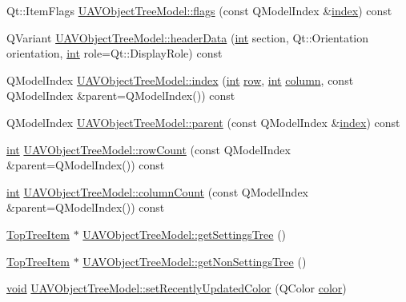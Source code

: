 \begin{DoxyCompactItemize}
\item 
Qt\-::\-Item\-Flags \hyperlink{group___u_a_v_object_browser_plugin_ga16ae36c54433edd7b07439edc1264b59}{U\-A\-V\-Object\-Tree\-Model\-::flags} (const Q\-Model\-Index \&\hyperlink{glext_8h_ab47dd9958bcadea08866b42bf358e95e}{index}) const 
\item 
Q\-Variant \hyperlink{group___u_a_v_object_browser_plugin_gaa19ce01eb026443086adfe5063bbc233}{U\-A\-V\-Object\-Tree\-Model\-::header\-Data} (\hyperlink{ioapi_8h_a787fa3cf048117ba7123753c1e74fcd6}{int} section, Qt\-::\-Orientation orientation, \hyperlink{ioapi_8h_a787fa3cf048117ba7123753c1e74fcd6}{int} role=Qt\-::\-Display\-Role) const 
\item 
Q\-Model\-Index \hyperlink{group___u_a_v_object_browser_plugin_ga9b9e52145b78d333effe586a41478701}{U\-A\-V\-Object\-Tree\-Model\-::index} (\hyperlink{ioapi_8h_a787fa3cf048117ba7123753c1e74fcd6}{int} \hyperlink{glext_8h_a11b277b422822f784ee248b43eee3e1e}{row}, \hyperlink{ioapi_8h_a787fa3cf048117ba7123753c1e74fcd6}{int} \hyperlink{glext_8h_a3b58c39b1b7ca6f4012b27e84de3bdb3}{column}, const Q\-Model\-Index \&parent=Q\-Model\-Index()) const 
\item 
Q\-Model\-Index \hyperlink{group___u_a_v_object_browser_plugin_ga8d23a2cd6d6b785179ebd12426f142e3}{U\-A\-V\-Object\-Tree\-Model\-::parent} (const Q\-Model\-Index \&\hyperlink{glext_8h_ab47dd9958bcadea08866b42bf358e95e}{index}) const 
\item 
\hyperlink{ioapi_8h_a787fa3cf048117ba7123753c1e74fcd6}{int} \hyperlink{group___u_a_v_object_browser_plugin_ga77552bcb5a7016909e6de111fb100744}{U\-A\-V\-Object\-Tree\-Model\-::row\-Count} (const Q\-Model\-Index \&parent=Q\-Model\-Index()) const 
\item 
\hyperlink{ioapi_8h_a787fa3cf048117ba7123753c1e74fcd6}{int} \hyperlink{group___u_a_v_object_browser_plugin_gafe7737e489b53e92c325a27785e690cd}{U\-A\-V\-Object\-Tree\-Model\-::column\-Count} (const Q\-Model\-Index \&parent=Q\-Model\-Index()) const 
\item 
\hyperlink{class_top_tree_item}{Top\-Tree\-Item} $\ast$ \hyperlink{group___u_a_v_object_browser_plugin_ga65564af37704d64b262417b4e5795b76}{U\-A\-V\-Object\-Tree\-Model\-::get\-Settings\-Tree} ()
\item 
\hyperlink{class_top_tree_item}{Top\-Tree\-Item} $\ast$ \hyperlink{group___u_a_v_object_browser_plugin_gaba7711ed458572937f031011b8ad9842}{U\-A\-V\-Object\-Tree\-Model\-::get\-Non\-Settings\-Tree} ()
\item 
\hyperlink{group___u_a_v_objects_plugin_ga444cf2ff3f0ecbe028adce838d373f5c}{void} \hyperlink{group___u_a_v_object_browser_plugin_gac3ae57e6538de964006edcdb0affb776}{U\-A\-V\-Object\-Tree\-Model\-::set\-Recently\-Updated\-Color} (Q\-Color \hyperlink{glext_8h_a3ea846f998d64f079b86052b6c4193a8}{color})

\end{DoxyCompactItemize}

